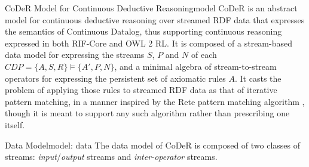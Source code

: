 \begin{nestedsection}{CoDeR Model for Continuous Deductive Reasoning}{model}
	CoDeR is an abstract model for continuous deductive reasoning over streamed RDF data that expresses the semantics of Continuous Datalog, thus supporting continuous reasoning expressed in both RIF-Core and OWL 2 RL.
	It is composed of a stream-based data model for expressing the streams $S$, $P$ and $N$ of each ${CDP = \{A,S,R\} \vDash \{A',P,N\}}$, and a minimal algebra of stream-to-stream operators for expressing the persistent set of axiomatic rules $A$.
	It casts the problem of applying those rules to streamed RDF data as that of iterative pattern matching, in a manner inspired by the Rete pattern matching algorithm \citep{forgy79}, though it is meant to support any such algorithm rather than prescribing one itself.

	\begin{nestedsection}{Data Model}{model: data}
		The data model of CoDeR is composed of two classes of streams: \emph{input}/\emph{output} streams and \emph{inter-operator} streams.


\end{nestedsection}
\end{nestedsection}
